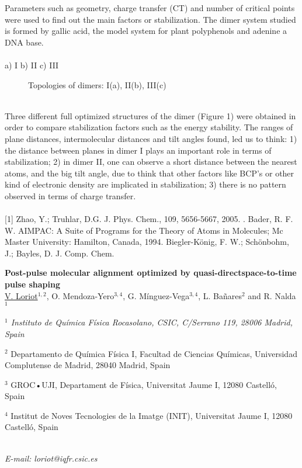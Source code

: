 Parameters such as geometry, charge transfer (CT) and number of critical
points were used to find out the main factors or stabilization. The dimer system
studied is formed by gallic acid, the model system for plant polyphenols and adenine
a DNA base.
\\
\\
a) I\hspace{3.3cm} b) II\hspace{5.5cm} c) III
\begin{figure}[h]
 {}
 {}
 {}
 \caption[]{ Topologies of dimers: I(a), II(b), III(c) }\label{figure 1}
\end{figure}
\\
Three different full optimized structures of the dimer (Figure 1) were obtained
in order to compare stabilization factors such as the energy stability.
The ranges of plane distances, intermolecular distances and tilt angles found,
led us to think: 1) the distance between planes in dimer I plays an important role in
terms of stabilization; 2) in dimer II, one can observe a short distance between the
nearest atoms, and the big tilt angle, due to think that other factors like BCP’s or
other kind of electronic density are implicated in stabilization; 3) there is no pattern
observed in terms of charge transfer.
\\
\vspace{0.5cm}
\\
{\footnotesize
[1] Zhao, Y.; Truhlar, D.G. J. Phys. Chem., 109, 5656-5667, 2005.
\newline
[2]. Bader, R. F. W. AIMPAC: A Suite of Programs for the Theory of Atoms in
Molecules; Mc Master University: Hamilton, Canada, 1994.
\newline
[3] Biegler-König, F. W.; Schönbohm, J.; Bayles, D. J. Comp. Chem.
}
\newpage
\setcounter{figure}{0}
\begin{center}
{\bf \Large
Post-pulse molecular alignment optimized by quasi-directspace-to-time pulse shaping
}
\\
\vspace{0.5cm}
\underline{V. Loriot}$^{1,2}$, O. Mendoza-Yero$^{3,4}$, G. Mínguez-Vega$^{3,4}$,
L. Bañares$^{2}$ and R. Nalda$^{1}$
\\
\vspace{0.5cm}
{\it
$^{1}$ Instituto de Química Física Rocasolano, CSIC, C/Serrano 119, 28006 Madrid, Spain

$^{2}$ Departamento de Química Física I, Facultad de Ciencias Químicas, Universidad Complutense de
Madrid, 28040 Madrid, Spain

$^{3}$ GROC•UJI, Departament de Física, Universitat Jaume I, 12080 Castelló, Spain

$^{4}$ Institut de Noves Tecnologies de la Imatge (INIT), Universitat Jaume I, 12080 Castelló, Spain
}
\\
\vspace{0.5cm}
{\it E-mail: loriot@iqfr.csic.es}
\\
\vspace{0.5cm}
\end{center}
